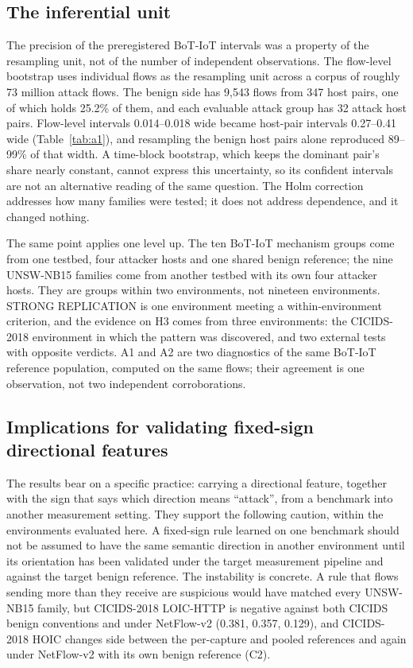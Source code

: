 \documentclass[preprint,12pt]{elsarticle}
\begin{document}
\subsection{The inferential unit}\label{sec:disc-units}

The precision of the preregistered BoT-IoT intervals was a property of the resampling unit, not of the number of independent observations. The flow-level bootstrap uses individual flows as the resampling unit across a corpus of roughly 73 million attack flows. The benign side has 9{,}543 flows from 347 host pairs, one of which holds 25.2\% of them, and each evaluable attack group has 32 attack host pairs. Flow-level intervals 0.014--0.018 wide became host-pair intervals 0.27--0.41 wide (Table~\ref{tab:a1}), and resampling the benign host pairs alone reproduced 89--99\% of that width. A time-block bootstrap, which keeps the dominant pair's share nearly constant, cannot express this uncertainty, so its confident intervals are not an alternative reading of the same question. The Holm correction addresses how many families were tested; it does not address dependence, and it changed nothing.

The same point applies one level up. The ten BoT-IoT mechanism groups come from one testbed, four attacker hosts and one shared benign reference; the nine UNSW-NB15 families come from another testbed with its own four attacker hosts. They are groups within two environments, not nineteen environments. STRONG REPLICATION is one environment meeting a within-environment criterion, and the evidence on H3 comes from three environments: the CICIDS-2018 environment in which the pattern was discovered, and two external tests with opposite verdicts. A1 and A2 are two diagnostics of the same BoT-IoT reference population, computed on the same flows; their agreement is one observation, not two independent corroborations.

\subsection{Implications for validating fixed-sign directional features}\label{sec:disc-implications}

The results bear on a specific practice: carrying a directional feature, together with the sign that says which direction means ``attack'', from a benchmark into another measurement setting. They support the following caution, within the environments evaluated here. A fixed-sign rule learned on one benchmark should not be assumed to have the same semantic direction in another environment until its orientation has been validated under the target measurement pipeline and against the target benign reference. The instability is concrete. A rule that flows sending more than they receive are suspicious would have matched every UNSW-NB15 family, but CICIDS-2018 LOIC-HTTP is negative against both CICIDS benign conventions and under NetFlow-v2 (0.381, 0.357, 0.129), and CICIDS-2018 HOIC changes side between the per-capture and pooled references and again under NetFlow-v2 with its own benign reference (C2).
\end{document}
